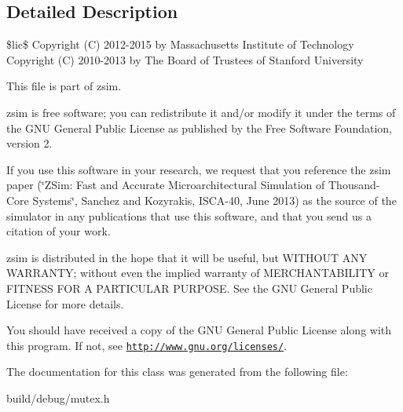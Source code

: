 \subsection{Detailed Description}
\$lic\$ Copyright (C) 2012-\/2015 by Massachusetts Institute of Technology Copyright (C) 2010-\/2013 by The Board of Trustees of Stanford University

This file is part of zsim.

zsim is free software; you can redistribute it and/or modify it under the terms of the G\-N\-U General Public License as published by the Free Software Foundation, version 2.

If you use this software in your research, we request that you reference the zsim paper (\char`\"{}\-Z\-Sim\-: Fast and Accurate Microarchitectural Simulation of
\-Thousand-\/\-Core Systems\char`\"{}, Sanchez and Kozyrakis, I\-S\-C\-A-\/40, June 2013) as the source of the simulator in any publications that use this software, and that you send us a citation of your work.

zsim is distributed in the hope that it will be useful, but W\-I\-T\-H\-O\-U\-T A\-N\-Y W\-A\-R\-R\-A\-N\-T\-Y; without even the implied warranty of M\-E\-R\-C\-H\-A\-N\-T\-A\-B\-I\-L\-I\-T\-Y or F\-I\-T\-N\-E\-S\-S F\-O\-R A P\-A\-R\-T\-I\-C\-U\-L\-A\-R P\-U\-R\-P\-O\-S\-E. See the G\-N\-U General Public License for more details.

You should have received a copy of the G\-N\-U General Public License along with this program. If not, see \href{http://www.gnu.org/licenses/}{\tt http\-://www.\-gnu.\-org/licenses/}. 

The documentation for this class was generated from the following file\-:\begin{DoxyCompactItemize}
\item 
build/debug/mutex.\-h\end{DoxyCompactItemize}
